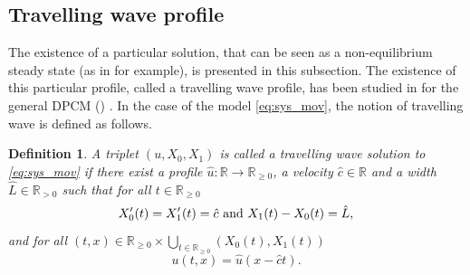 \documentclass{amsart}
\newcommand\R{\mathbb{R}}
\newtheorem{definition}{Definition}
\begin{document}
	\subsection{Travelling wave profile}
	The existence of a particular solution, that can be seen as a non-equilibrium steady state (as in \cite{Mielke} for example), is presented in this subsection. The existence of this particular profile, called a travelling wave profile, has been studied in \cite{Breden} for the general DPCM (\cite{Bataillon_elec}) . In the case of the model \eqref{eq:sys_mov}, the notion of travelling wave is defined as follows.
	\begin{definition}
		A triplet $(u, X_0, X_1)$ is called a travelling wave solution to \eqref{eq:sys_mov} if there exist a profile $\hat{u} : \R \rightarrow \R_{\geq 0}$, a velocity $\hat{c} \in \R$ and a width $\hat{L} \in \R_{>0}$ such that for all $t \in \R_{\geq 0}$
		\begin{equation} \label{eq:tw_bord}
			X_0'(t) = X_1'(t) = \hat{c} \textnormal{ and } X_1(t) - X_0(t) = \hat{L},
		\end{equation}
		and for all $(t,x) \in \R_{\geq 0} \times \bigcup_{t \in \R_{\geq 0}}(X_0(t), X_1(t))$
		\begin{equation} \label{eq:tw_u}
			u(t,x) = \hat{u}(x-\hat{c}t).
		\end{equation}
	\end{definition} 
\end{document}
